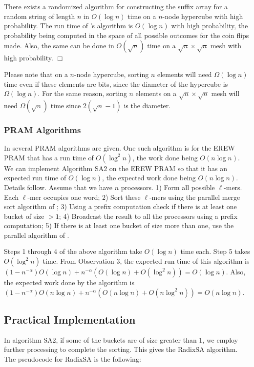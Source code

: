 \begin{theorem}
There exists a randomized algorithm for constructing the suffix array for a
random string of length $n$ in $O(\log n)$ time on a $n$-node hypercube with
high probability. The run time of \cite{ReVa87}'s algorithm is $O(\log n)$ with
high probability, the probability being computed in the space of all possible
outcomes for the coin flips made. Also, the same can be done in $O(\sqrt n)$
time on a $\sqrt n\times\sqrt n$ mesh with high probability. $\Box$
\end{theorem}


 Please note that on a $n$-node hypercube, sorting
$n$ elements will need $\Omega(\log n)$ time even if these elements are bits,
since the diameter of the hypercube is $\Omega(\log n)$. For the same reason,
sorting $n$ elements on a $\sqrt n\times\sqrt n$ mesh will need $\Omega(\sqrt
n)$ time since $2(\sqrt n-1)$ is the diameter.



\subsubsection{PRAM Algorithms}
In \cite{KaSa03} several PRAM algorithms are given. One such algorithm is for
the EREW PRAM that has a run time of $O(\log^2n)$, the work done being $O(n\log
n)$. We can implement Algorithm SA2 on the EREW PRAM so that it has an expected
run time of $O(\log n)$, the expected work done being $O(n\log n)$. Details
follow. Assume that we have $n$ processors. 1) Form all possible $\ell$-mers.
Each $\ell$-mer occupies one word; 2) Sort these $\ell$-mers using the parallel
merge sort algorithm of \cite{Col88};  3) Using a prefix computation check if
there is at least one bucket of size $>1$; 4) Broadcast the result to all the
processors using a prefix computation; 5) If there is at least one bucket of
size more than one, use the parallel algorithm of \cite{KaSa03}.

Steps 1 through 4 of the above algorithm take $O(\log n)$ time each. Step 5
takes $O(\log^2n)$ time. From Observation 3, the expected run time of this
algorithm is $(1-n^{-\alpha})O(\log n)+n^{-\alpha}(O(\log n)+O(\log^2n))=O(\log
n)$. Also, the expected work done by the algorithm is $(1-n^{-\alpha})O(n\log
n)+n^{-\alpha}(O(n\log n)+O(n\log^2n))=O(n\log n)$.

\subsection{Practical Implementation}
In algorithm SA2, if some of the buckets are of size greater than 1, we employ
further processing to complete the sorting. This gives the RadixSA algorithm.
The pseudocode for RadixSA is the following:

